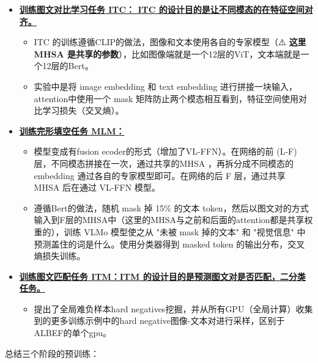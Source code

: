 \documentclass[zihao=false,fontset=windows]{ctexart}
\newcommand{\feiEmoji}[1]{{\emojifont #1}}
\begin{document}
\begin{itemize}
\item \href{https://scnajei2ds6y.feishu.cn/wiki/U5sZwCwKwivERwktFWvcdM50nkf\#HFfNdb3hbobohJxMPu3cEHuPnue}{\textbf{训练图文对比学习任务 ITC： ITC 的设计目的是让不同模态的在特征空间对齐。}}
\begin{itemize}
\item ITC 的训练遵循CLIP的做法，图像和文本使用各自的专家模型（\feiEmoji{⚠️} \textbf{这里 MHSA 是共享的参数}），比如图像端就是一个12层的ViT，文本端就是一个12层的Bert。
\item 实验中是将 image embedding 和 text embedding 进行拼接一块输入，attention中使用一个 mask 矩阵防止两个模态相互看到，特征空间使用对比学习损失（交叉熵）。
\end{itemize}
\item \href{https://scnajei2ds6y.feishu.cn/wiki/U5sZwCwKwivERwktFWvcdM50nkf\#C7YrdlkjHoRWhVxE5BicV7xNnjJ}{\textbf{训练完形填空任务 MLM：}}
\begin{itemize}
\item 模型变成有fusion ecoder的形式（增加了VL-FFN）。在网络的前 (L-F) 层，不同模态拼接在一次，通过共享的MHSA ，再拆分成不同模态的 embedding 通过各自的专家模型即可。在网络的后 F 层，通过共享 MHSA 后在通过 VL-FFN 模型。
\item 遵循Bert的做法，随机 mask 掉 15\% 的文本 token，然后以图文对的方式输入到F层的MHSA中（这里的MHSA与之前和后面的attention都是共享权重的），训练 VLMo 模型使之从 "未被 mask 掉的文本" 和 "视觉信息" 中预测盖住的词是什么。使用分类器得到 masked token 的输出分布，交叉熵损失训练。
\end{itemize}
\item \href{https://scnajei2ds6y.feishu.cn/wiki/U5sZwCwKwivERwktFWvcdM50nkf\#S7ObdE0VwojSbQxDqNJcmZmQnpb}{\textbf{训练图文匹配任务 ITM：ITM 的设计目的是预测图文对是否匹配，二分类任务。}}
\begin{itemize}
\item 提出了全局难负样本hard negatives挖掘，并从所有GPU（全局计算）收集到的更多训练示例中的hard negative图像-文本对进行采样，区别于ALBEF的单个gpu。
\end{itemize}
\end{itemize}
总结三个阶段的预训练：\par
\end{document}
